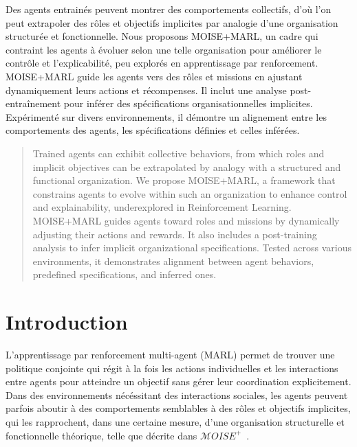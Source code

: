 \documentclass[dissemination]{jfsma}
\begin{document}
\maketitle

\begin{resume}
  Des agents entrainés peuvent montrer des comportements collectifs, d’où l’on peut extrapoler des rôles et objectifs implicites par analogie d'une organisation structurée et fonctionnelle. Nous proposons MOISE+MARL, un cadre qui contraint les agents à évoluer selon une telle organisation pour améliorer le contrôle et l’explicabilité, peu explorés en apprentissage par renforcement.
  MOISE+MARL guide les agents vers des rôles et missions en ajustant dynamiquement leurs actions et récompenses. Il inclut une analyse post-entraînement pour inférer des spécifications organisationnelles implicites. Expérimenté sur divers environnements, il démontre un alignement entre les comportements des agents, les spécifications définies et celles inférées.
\end{resume}



\begin{abstract}
  Trained agents can exhibit collective behaviors, from which roles and implicit objectives can be extrapolated by analogy with a structured and functional organization. We propose MOISE+MARL, a framework that constrains agents to evolve within such an organization to enhance control and explainability, underexplored in Reinforcement Learning.
  MOISE+MARL guides agents toward roles and missions by dynamically adjusting their actions and rewards. It also includes a post-training analysis to infer implicit organizational specifications. Tested across various environments, it demonstrates alignment between agent behaviors, predefined specifications, and inferred ones.
\end{abstract}


\section{Introduction}

L'apprentissage par renforcement multi-agent (MARL) permet de trouver une politique conjointe qui régit à la fois les actions individuelles et les interactions entre agents pour atteindre un objectif sans gérer leur coordination explicitement. Dans des environnements nécéssitant des interactions sociales, les agents peuvent parfois aboutir à des comportements semblables à des rôles et objectifs implicites, qui les rapprochent, dans une certaine mesure, d'une organisation structurelle et fonctionnelle théorique, telle que décrite dans $\mathcal{M}OISE^+$~\cite{Hubner2007}.
\end{document}
